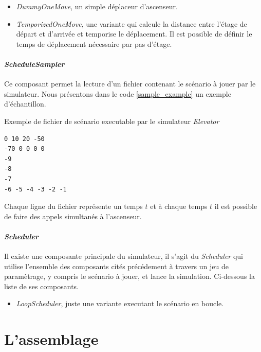 \documentclass[twocolumn,oneside,10pt]{article}
\newcommand {\elevator}   {{\em Elevator}}
\begin{document}
\begin{itemize}
\item {\em DummyOneMove}, un simple déplaceur d'ascenseur.\\
\item {\em TemporizedOneMove}, une variante qui calcule la distance entre l'étage de départ et d'arrivée et temporise le déplacement. Il est possible de définir le temps de déplacement nécessaire par pas d'étage.
\end{itemize}

\paragraph{\em ScheduleSampler}

Ce composant permet la lecture d'un fichier contenant le scénario à jouer par le simulateur. Nous présentons dans le code \ref{sample_example} un exemple d'échantillon.

\begin{algorithm}[h]
  \caption{Exemple de fichier de scénario executable par le simulateur \elevator}
  \label{sample_example}
\begin{verbatim}
0 10 20 -50
-70 0 0 0 0
-9
-8
-7
-6 -5 -4 -3 -2 -1
\end{verbatim}
\end{algorithm}

Chaque ligne du fichier représente un temps $t$ et à chaque temps $t$ il est possible de faire des appels simultanés à l'ascenseur.

\paragraph{\em Scheduler}

Il existe une composante principale du simulateur, il s'agit du {\em Scheduler} qui utilise l'ensemble des composants cités précédement à travers un jeu de paramètrage, y compris le scénario à jouer, et lance la simulation. Ci-dessous la liste de ses composants.\\

\begin{itemize}
\item {\em LoopScheduler}, juste une variante executant le scénario en boucle.
\end{itemize}

\section{L'assemblage}
\end{document}
